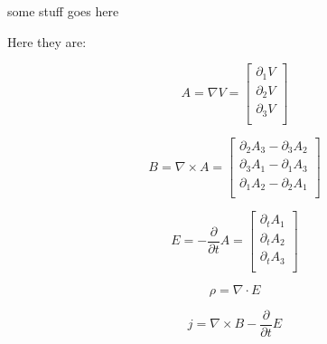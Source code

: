 \documentclass{article}
\begin{document}
some stuff goes here


Here they are: 

\begin{equation}
A = \nabla  V =
        \begin{bmatrix}
            \partial_1 V \\
            \partial_2 V \\
            \partial_3 V \\
        \end{bmatrix}
\end{equation}

\begin{equation}
B = \nabla \times A = 
    \begin{bmatrix}
       \partial_2 A_3 - \partial_3 A_2 \\
       \partial_3 A_1 - \partial_1 A_3 \\
       \partial_1 A_2 - \partial_2 A_1 \\
    \end{bmatrix}
\end{equation}

\begin{equation}
E = - \frac{\partial}{\partial t} A = 
    \begin{bmatrix}
        \partial_t A_1 \\
        \partial_t A_2 \\
        \partial_t A_3 \\
    \end{bmatrix}
\end{equation}

\begin{equation}
\rho = \nabla \cdot E
\end{equation}

\begin{equation}
j = \nabla \times B - \frac{\partial}{\partial t} E
\end{equation}







% 
\end{document}
